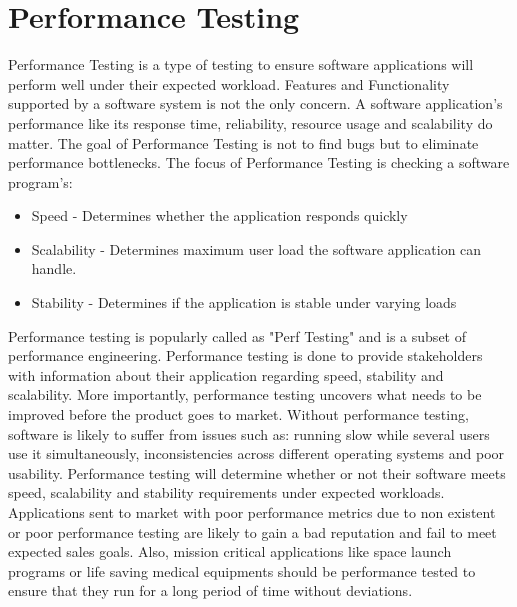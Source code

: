 \documentclass[../thesis.tex]{subfiles}
\begin{document}
\section{Performance Testing}
Performance Testing is a type of testing to ensure software applications will perform well under their expected workload. Features and Functionality supported by a software system is not the only concern. A software application's performance like its response time, reliability, resource usage and scalability do matter. The goal of Performance Testing is not to find bugs but to eliminate performance bottlenecks.
\vspace{5mm}
The focus of Performance Testing is checking a software program's:
\vspace{5mm}
\begin{itemize}
\item Speed - Determines whether the application responds quickly
\vspace{5mm}
\item Scalability - Determines maximum user load the software application can handle.
\vspace{5mm}
\item Stability - Determines if the application is stable under varying loads
\end{itemize}
\vspace{5mm}
Performance testing is popularly called as "Perf Testing" and is a subset of performance engineering. Performance testing is done to provide stakeholders with information about their application regarding speed, stability and scalability. More importantly, performance testing uncovers what needs to be improved before the product goes to market. Without performance testing, software is likely to suffer from issues such as: running slow while several users use it simultaneously, inconsistencies across different operating systems and poor usability. Performance testing will determine whether or not their software meets speed, scalability and stability requirements under expected workloads. Applications sent to market with poor performance metrics due to non existent or poor performance testing are likely to gain a bad reputation and fail to meet expected sales goals. Also, mission critical applications like space launch programs or life saving medical equipments should be performance tested to ensure that they run for a long period of time without deviations.
\end{document}
